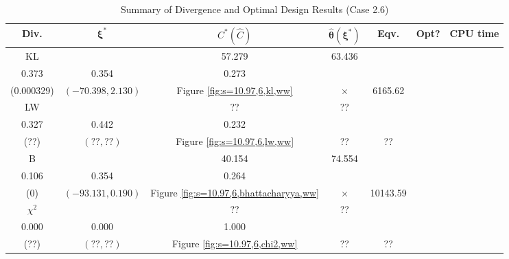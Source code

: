 \documentclass[12pt, a4paper]{article}
\begin{document}
\begin{table}[H]
\centering
\renewcommand{\arraystretch}{1.5} %
\setlength{\tabcolsep}{8pt} %
\begin{tabular}{|c|c|c|c|c|c|c|}
\hline
\textbf{Div.} & \(\boldsymbol{\xi^*}\) & \(C^* (\hat{C})\) & \(\boldsymbol{\hat{\theta}(\xi^*)}\) & \textbf{Eqv.} & \textbf{Opt?} & \textbf{CPU time} \\
\hline
KL & \(\left\{\begin{array}{ccc}
10 & 57.279 & 63.436 \\
0.373 & 0.354 & 0.273
\end{array}\right\}\) &
\(\begin{array}{c}
0.000934 \\
(0.000329)
\end{array}\) & 
\((-70.398, 2.130)\) & 
Figure \ref{fig:s=10.97,6,kl,ww} & $\times$ & 6165.62 \\
\hline
LW & \(\left\{\begin{array}{ccc}
?? & ?? & ?? \\
0.327 & 0.442 & 0.232
\end{array}\right\}\) &
\(\begin{array}{c}
?? \\
(??)
\end{array}\) & 
\((??, ??)\) & 
Figure \ref{fig:s=10.97,6,lw,ww} & ?? & ?? \\
\hline
B & \(\left\{\begin{array}{ccc}
28.098 & 40.154 & 74.554 \\
0.106 & 0.354 & 0.264
\end{array}\right\}\) &
\(\begin{array}{c}
0 \\
(0)
\end{array}\) & 
\((-93.131, 0.190)\) & 
Figure \ref{fig:s=10.97,6,bhattacharyya,ww} & $\times$ & 10143.59 \\
\hline
\(\chi^2\) & \(\left\{\begin{array}{ccc}
?? & ?? & ?? \\
0.000 & 0.000 & 1.000
\end{array}\right\}\) &
\(\begin{array}{c}
?? \\
(??)
\end{array}\) & 
\((??, ??)\) & 
Figure \ref{fig:s=10.97,6,chi2,ww} & ?? & ?? \\
\hline
\end{tabular}
\caption{Summary of Divergence and Optimal Design Results (Case 2.6)}
\label{tab:results2.6}
\end{table}
\end{document}
